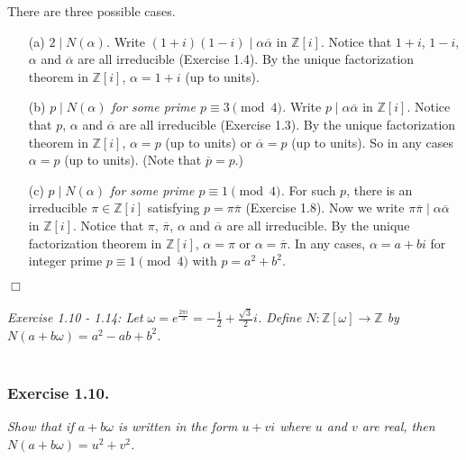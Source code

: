 \documentclass{article}
\begin{document}
There are three possible cases.
\begin{enumerate}
  \item[(a)]
  \emph{$2 \mid N(\alpha)$.}
  Write $(1+i)(1-i) \mid \alpha \overline{\alpha}$ in $\mathbb{Z}[i]$.
  Notice that $1+i$, $1-i$, $\alpha$ and $\overline{\alpha}$ are all irreducible (Exercise 1.4).
  By the unique factorization theorem in $\mathbb{Z}[i]$,
  $\alpha = 1+i$ (up to units).
  \item[(b)]
  \emph{$p \mid N(\alpha)$ for some prime $p \equiv 3 \pmod{4}$.}
  Write $p \mid \alpha \overline{\alpha}$ in $\mathbb{Z}[i]$.
  Notice that $p$, $\alpha$ and $\overline{\alpha}$ are all irreducible (Exercise 1.3).
  By the unique factorization theorem in $\mathbb{Z}[i]$,
  $\alpha = p$ (up to units) or $\overline{\alpha} = p$ (up to units).
  So in any cases $\alpha = p$ (up to units). (Note that $\overline{p} = p$.)
  \item[(c)]
  \emph{$p \mid N(\alpha)$ for some prime $p \equiv 1 \pmod{4}$.}
  For such $p$, there is an irreducible $\pi \in \mathbb{Z}[i]$
  satisfying $p = \pi \overline{\pi}$ (Exercise 1.8).
  Now we write $\pi \overline{\pi} \mid \alpha \overline{\alpha}$ in $\mathbb{Z}[i]$.
  Notice that $\pi$, $\overline{\pi}$, $\alpha$ and $\overline{\alpha}$ are all irreducible.
  By the unique factorization theorem in $\mathbb{Z}[i]$,
  $\alpha = \pi$ or $\alpha = \overline{\pi}$.
  In any cases, $\alpha=a+bi$ for integer prime $p \equiv 1 \pmod{4}$
  with $p = a^2+b^2$.
\end{enumerate}
$\Box$ \\\\






\emph{Exercise 1.10 - 1.14: Let
$\omega
= e^{\frac{2\pi i}{3}}
= -\frac{1}{2}+\frac{\sqrt{3}}{2}i$.
Define $N: \mathbb{Z}[\omega] \to \mathbb{Z}$ by
$N(a+b\omega) = a^2-ab+b^2$. } \\\\



\subsubsection*{Exercise 1.10.}
\emph{Show that if $a+b\omega$ is written in the form $u+vi$
where $u$ and $v$ are real, then $N(a+b\omega)=u^2+v^2$.}
\end{document}
